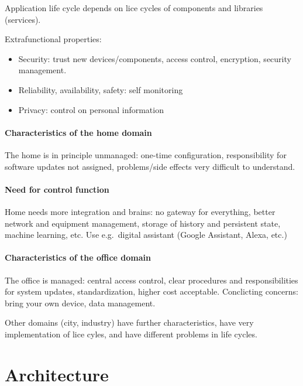 \documentclass[11pt]{article}
\begin{document}
    Application life cycle depends on lice cycles of components and libraries (services).

    Extrafunctional properties:
    \begin{itemize}
        \item Security: trust new devices/components, access control, encryption, security management.
        \item Reliability, availability, safety: self monitoring
        \item Privacy: control on personal information
    \end{itemize}

    \paragraph{Characteristics of the home domain}
    The home is in principle unmanaged: one-time configuration, responsibility for software updates not assigned, problems/side effects very difficult to understand.

    \paragraph{Need for control function}
    Home needs more integration and brains: no gateway for everything, better network and equipment management, storage of history and persistent state, machine learning, etc.
    Use e.g.\ digital assistant (Google Assistant, Alexa, etc.)

    \paragraph{Characteristics of the office domain}
    The office is managed: central access control, clear procedures and responsibilities for system updates, standardization, higher cost acceptable.
    Conclicting concerns: bring your own device, data management.

    Other domains (city, industry) have further characteristics, have very implementation of lice cyles, and have different problems in life cycles.

    \section{Architecture}
\end{document}
